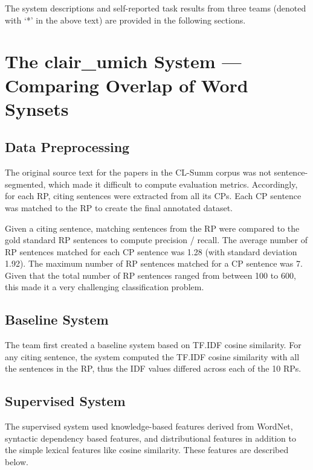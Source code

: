 \documentclass[11pt]{article}
\begin{document}
The system descriptions and self-reported task results from three teams (denoted with `*' in the above text) are provided in the following sections. 

\section{The clair\_umich System --- Comparing Overlap of Word Synsets}
\label{s:umich}
\subsection{Data Preprocessing}

The original source text for the papers in the CL-Summ corpus was not sentence-segmented, which made it difficult to compute evaluation metrics. Accordingly, for each RP, citing sentences were extracted from all its CPs. Each CP sentence was matched to the RP to create the final annotated dataset. 

Given a citing sentence, matching sentences from the RP were compared to the gold standard RP sentences to compute precision / recall. The average number of RP sentences matched for each CP sentence was 1.28 (with standard deviation 1.92). The maximum number of RP sentences matched for a CP sentence was 7. Given that the total number of RP sentences ranged from between 100 to 600, this made it a very challenging classification problem. 

\subsection{Baseline System}

The team first created a baseline system based on TF.IDF cosine similarity. For any citing sentence, the system computed the TF.IDF
cosine similarity with all the sentences in the RP, thus the IDF values differed across each of the 10 RPs.

\subsection{Supervised System}
The supervised system used knowledge-based features derived from WordNet, syntactic dependency based features, and distributional features in addition to the simple lexical features like cosine similarity. These features are described below.
\end{document}
